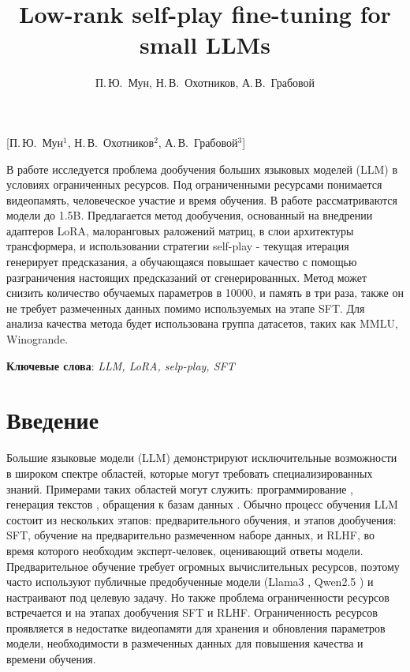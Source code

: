 \documentclass[12pt, twoside]{article}
\begin{document}
\title
    [] %
    {Low-rank self-play fine-tuning for small LLMs}
\author
    [] %
    {П.\,Ю.~Мун, Н.\,В.~Охотников, А.\,В.~Грабовой} %
    [П.\,Ю.~Мун$^1$, Н.\,В.~Охотников$^2$, А.\,В.~Грабовой$^3$] %

\abstract
  {В работе исследуется проблема дообучения больших языковых моделей (LLM) в условиях ограниченных ресурсов. Под ограниченными ресурсами понимается видеопамять, человеческое участие и время обучения. В работе рассматриваются модели до 1.5B. Предлагается метод дообучения, основанный на внедрении адаптеров LoRA, малоранговых раложений матриц, в слои архитектуры трансформера, и использовании стратегии self-play - текущая итерация генерирует предсказания, а обучающаяся повышает качество с помощью разграничения настоящих предсказаний от сгенерированных. Метод может снизить количество обучаемых параметров в 10000, и память в три раза, также он не требует размеченных данных помимо используемых на этапе SFT. Для анализа качества метода будет использована группа датасетов, таких как MMLU, Winogrande.


\bigskip
\noindent
\textbf{Ключевые слова}: \emph {LLM, LoRA, selp-play, SFT}
}
\doi{}
\receivedRus{}
\receivedEng{}

\maketitle
\linenumbers
\section{Введение}
Большие языковые модели (LLM) демонстрируют исключительные возможности в широком спектре областей, которые могут требовать специализированных знаний. Примерами таких областей могут служить: программирование \parencite{Chen2021}, генерация текстов \parencite{Touvron2023}, обращения к базам данных \parencite{Zhong2017}. Обычно процесс обучения LLM состоит из нескольких этапов: предварительного обучения, и этапов дообучения: SFT, обучение на предварительно размеченном наборе данных, и RLHF, во время которого необходим эксперт-человек, оценивающий ответы модели. Предварительное обучение требует огромных вычислительных ресурсов, поэтому часто используют публичные предобученные модели (Llama3 \parencite{Dubey2024}, Qwen2.5 \parencite{Yang2025}) и настраивают под целевую задачу. Но также проблема ограниченности ресурсов встречается и на этапах дообучения SFT и RLHF. Ограниченность ресурсов проявляется в недостатке видеопамяти для хранения и обновления параметров модели, необходимости в размеченных данных для повышения качества и времени обучения.
\end{document}

